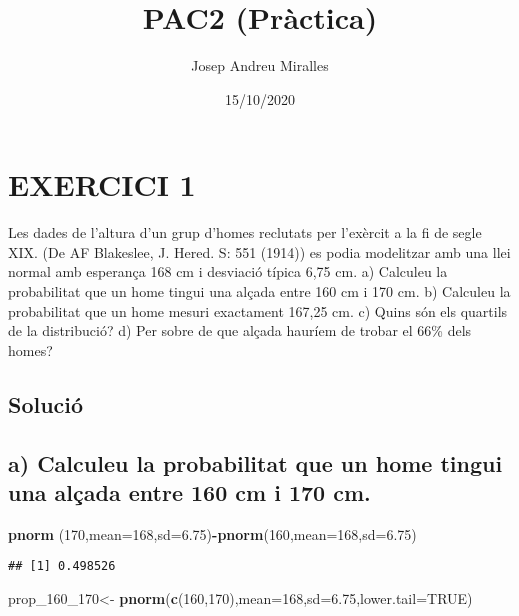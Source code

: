 \documentclass[
]{article}
\title{PAC2 (Pràctica)}
\author{Josep Andreu Miralles}
\date{15/10/2020}
\newenvironment{Shaded}{\begin{snugshade}}{\end{snugshade}}
\newcommand{\DataTypeTok}[1]{\textcolor[rgb]{0.13,0.29,0.53}{#1}}
\newcommand{\DecValTok}[1]{\textcolor[rgb]{0.00,0.00,0.81}{#1}}
\newcommand{\FloatTok}[1]{\textcolor[rgb]{0.00,0.00,0.81}{#1}}
\newcommand{\KeywordTok}[1]{\textcolor[rgb]{0.13,0.29,0.53}{\textbf{#1}}}
\newcommand{\NormalTok}[1]{#1}
\newcommand{\OperatorTok}[1]{\textcolor[rgb]{0.81,0.36,0.00}{\textbf{#1}}}
\newcommand{\OtherTok}[1]{\textcolor[rgb]{0.56,0.35,0.01}{#1}}
\newcommand{\StringTok}[1]{\textcolor[rgb]{0.31,0.60,0.02}{#1}}
\begin{document}
\maketitle

\hypertarget{exercici-1}{%
\section{EXERCICI 1}\label{exercici-1}}

Les dades de l'altura d'un grup d'homes reclutats per l'exèrcit a la fi
de segle XIX. (De AF Blakeslee, J. Hered. S: 551 (1914)) es podia
modelitzar amb una llei normal amb esperança 168 cm i desviació típica
6,75 cm. a) Calculeu la probabilitat que un home tingui una alçada entre
160 cm i 170 cm. b) Calculeu la probabilitat que un home mesuri
exactament 167,25 cm. c) Quins són els quartils de la distribució? d)
Per sobre de que alçada hauríem de trobar el 66\% dels homes?

\hypertarget{soluciuxf3}{%
\subsection{Solució}\label{soluciuxf3}}

\hypertarget{a-calculeu-la-probabilitat-que-un-home-tingui-una-aluxe7ada-entre-160-cm-i-170-cm.}{%
\subsection{a) Calculeu la probabilitat que un home tingui una alçada
entre 160 cm i 170
cm.}\label{a-calculeu-la-probabilitat-que-un-home-tingui-una-aluxe7ada-entre-160-cm-i-170-cm.}}

\begin{Shaded}
\begin{Highlighting}[]
\KeywordTok{pnorm}\NormalTok{ (}\DecValTok{170}\NormalTok{,}\DataTypeTok{mean=}\DecValTok{168}\NormalTok{,}\DataTypeTok{sd=}\FloatTok{6.75}\NormalTok{)}\OperatorTok{-}\KeywordTok{pnorm}\NormalTok{(}\DecValTok{160}\NormalTok{,}\DataTypeTok{mean=}\DecValTok{168}\NormalTok{,}\DataTypeTok{sd=}\FloatTok{6.75}\NormalTok{)}
\end{Highlighting}
\end{Shaded}

\begin{verbatim}
## [1] 0.498526
\end{verbatim}

\begin{Shaded}
\begin{Highlighting}[]
\NormalTok{prop_}\DecValTok{160}\NormalTok{_}\DecValTok{170}\NormalTok{<-}\StringTok{ }\KeywordTok{pnorm}\NormalTok{(}\KeywordTok{c}\NormalTok{(}\DecValTok{160}\NormalTok{,}\DecValTok{170}\NormalTok{),}\DataTypeTok{mean=}\DecValTok{168}\NormalTok{,}\DataTypeTok{sd=}\FloatTok{6.75}\NormalTok{,}\DataTypeTok{lower.tail=}\OtherTok{TRUE}\NormalTok{)}
\end{Highlighting}
\end{Shaded}
\end{document}
